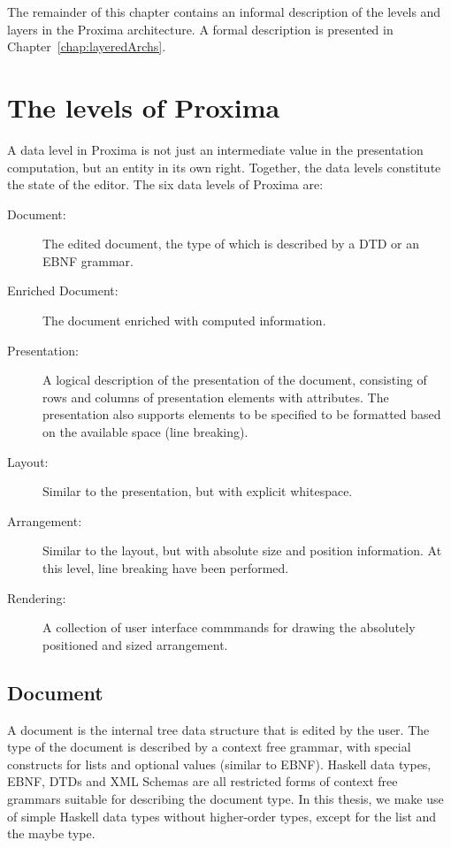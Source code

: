 The remainder of this chapter contains an informal description of the levels and layers in the Proxima architecture. A formal description is presented in Chapter~\ref{chap:layeredArchs}.

\section{The levels of Proxima}

A data level in Proxima is not just an intermediate value in the presentation computation, but an entity in its own right. Together, the data levels constitute the state of the editor. The six data levels of Proxima are:

\begin{description}
\item[Document:] The edited document, the type of which is described by a DTD or an EBNF grammar.

\item[Enriched Document:] The document enriched with computed information.

\item[Presentation:] A logical description of the presentation of the document, consisting of rows and columns of presentation elements with attributes. The presentation also supports elements to be specified to be formatted based on the available space (line breaking).

\item[Layout:]  Similar to the presentation, but with explicit whitespace.

\item[Arrangement:] Similar to the layout, but with absolute size and position information. At this level, line breaking have been performed.

\item[Rendering:] A collection of user interface commmands for drawing the absolutely positioned and sized arrangement.
\end{description}

\subsection{Document} \label {sect:docLevel}

A document is the internal tree data structure that is edited by the user. The type of the document is described by a context free grammar, with special constructs for lists and optional values (similar to EBNF). Haskell data types, EBNF, DTDs and XML Schemas are all restricted forms of context free grammars suitable for describing the document type. In this thesis, we make use of simple Haskell data types without higher-order types, except for the list and the maybe type.

